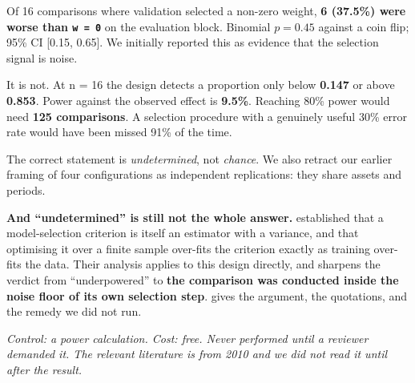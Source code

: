 Of 16 comparisons where validation selected a non-zero weight, \textbf{6 (37.5\%) were worse than
\texttt{w\ =\ 0}} on the evaluation block. Binomial \(p = 0.45\) against a coin flip; 95\% CI
{[}0.15, 0.65{]}. We initially reported this as evidence that the selection signal is noise.

It is not. At n = 16 the design detects a proportion only below \textbf{0.147} or above \textbf{0.853}.
Power against the observed effect is \textbf{9.5\%}. Reaching 80\% power would need \textbf{125
comparisons}. A selection procedure with a genuinely useful 30\% error rate would have been
missed 91\% of the time.

The correct statement is \emph{undetermined}, not \emph{chance}. We also retract our earlier framing of
four configurations as independent replications: they share assets and periods.

\textbf{And ``undetermined'' is still not the whole answer.} \citet{cawley2010over} established
that a model-selection criterion is itself an estimator with a variance, and that optimising it
over a finite sample over-fits the criterion exactly as training over-fits the data. Their
analysis applies to this design directly, and sharpens the verdict from ``underpowered'' to
\textbf{the comparison was conducted inside the noise floor of its own selection step}. 
gives the argument, the quotations, and the remedy we did not run.

\emph{Control: a power calculation. Cost: free. Never performed until a reviewer demanded it.
The relevant literature is from 2010 and we did not read it until after the result.}
